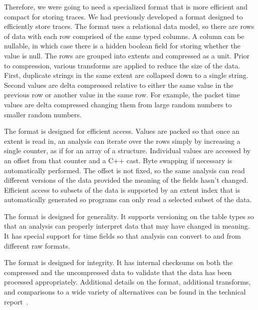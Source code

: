Therefore, we were going to need a specialized format that is more
efficient and compact for storing traces.  We had previously developed
a format designed to efficiently store traces.  The format uses a
relational data model, so there are rows of data with each row
comprised of the same typed columns.  A column can be nullable, in
which case there is a hidden boolean field for storing whether the
value is null.  The rows are grouped into extents and compressed as a
unit.  Prior to compression, various transforms are applied to reduce
the size of the data.  First, duplicate strings in the same extent are
collapsed down to a single string.  Second values are delta compressed
relative to either the same value in the previous row or another value
in the same row.  For example, the packet time values are delta
compressed changing them from large random numbers to smaller random
numbers.  

The format is designed for efficient access. Values are packed so that
once an extent is read in, an analysis can iterate over the rows
simply by increasing a single counter, as if for an array of a
structure.  Individual values are accessed by an offset from that
counter and a C++ cast.  Byte swapping if necessary is automatically
performed.  The offset is not fixed, so the same analysis can read
different versions of the data provided the meaning of the fields
hasn't changed.  Efficient access to subsets of the data is supported
by an extent index that is automatically generated so programs can
only read a selected subset of the data.

The format is designed for generality. It supports versioning on the
table types so that an analysis can properly interpret data that may
have changed in meaning.  It has special support for time fields so
that analysis can convert to and from different raw formats.

The format is designed for integrity.  It has internal checksums on
both the compressed and the uncompressed data to validate that the
data has been processed appropriately.  Additional details on the
format, additional transforms, and comparisons to a wide variety of
alternatives can be found in the technical
report~\cite{DSTechnicalReportSnapshot}.
